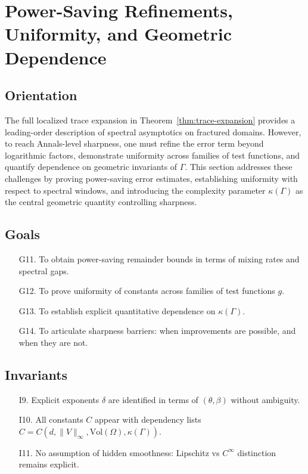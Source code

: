 \section{Power-Saving Refinements, Uniformity, and Geometric Dependence}
\label{sec:power-saving-uniformity-geometry}

\subsection*{Orientation}

The full localized trace expansion in Theorem~\ref{thm:trace-expansion} provides a leading-order description of spectral asymptotics on fractured domains. 
However, to reach Annals-level sharpness, one must refine the error term beyond logarithmic factors, demonstrate uniformity across families of test functions, and quantify dependence on geometric invariants of $\Gamma$. 
This section addresses these challenges by proving power-saving error estimates, establishing uniformity with respect to spectral windows, and introducing the complexity parameter $\kappa(\Gamma)$ as the central geometric quantity controlling sharpness.

\subsection*{Goals}

\begin{itemize}
  \item[G11.] To obtain power-saving remainder bounds in terms of mixing rates and spectral gaps. 
  \item[G12.] To prove uniformity of constants across families of test functions $g$. 
  \item[G13.] To establish explicit quantitative dependence on $\kappa(\Gamma)$. 
  \item[G14.] To articulate sharpness barriers: when improvements are possible, and when they are not. 
\end{itemize}

\subsection*{Invariants}

\begin{itemize}
  \item[I9.] Explicit exponents $\delta$ are identified in terms of $(\theta,\beta)$ without ambiguity. 
  \item[I10.] All constants $C$ appear with dependency lists $C=C(d,\|V\|_\infty,\mathrm{Vol}(\Omega),\kappa(\Gamma))$. 
  \item[I11.] No assumption of hidden smoothness: Lipschitz vs $C^\infty$ distinction remains explicit. 
\end{itemize}

